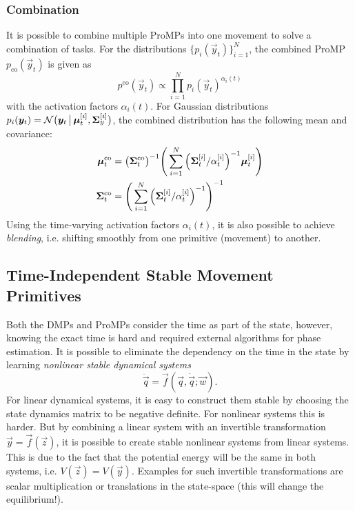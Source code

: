 			\subsubsection{Combination}
				It is possible to combine multiple ProMPs into one movement to solve a combination of tasks. For the distributions \( \{ p_i(\vec{y}_t) \}_{i = 1}^{N} \), the combined ProMP \( p_\mathrm{co}(\vec{y}_t) \) is given as
				\begin{equation*}
					p^\mathrm{co}(\vec{y}_t) \propto \prod_{i = 1}^{N} p_i(\vec{y}_t)^{\alpha_i(t)}
				\end{equation*}
				with the activation factors \( \alpha_i(t) \). For Gaussian distributions \( p_i(\bm{y}_t) = \mathcal{N}\big( \bm{y}_t \,\big\vert\, \bm{\mu}_t^{[i]}, \bm{\Sigma}_y^{[i]} \big) \), the combined distribution has the following mean and covariance:
				\begin{align*}
					\bm{\mu}_t^\mathrm{co} &= \big( \bm{\Sigma}_t^\mathrm{co} \big)^{-1} \Bigg( \sum_{i = 1}^{N} \Big( \bm{\Sigma}_t^{[i]} / \alpha_t^{[i]} \Big)^{-1} \bm{\mu}_t^{[i]} \Bigg) \\
					\bm{\Sigma}_t^\mathrm{co} &= \Bigg( \sum_{i = 1}^{N} \Big( \bm{\Sigma}_t^{[i]} / \alpha_t^{[i]} \Big)^{-1} \Bigg)^{-1}
				\end{align*}
				Using the time-varying activation factors \( \alpha_i(t) \), it is also possible to achieve \emph{blending}, i.e. shifting smoothly from one primitive (movement) to another.

		\subsection{Time-Independent Stable Movement Primitives}
			Both the DMPs and ProMPs consider the time as part of the state, however, knowing the exact time is hard and required external algorithms for phase estimation. It is possible to eliminate the dependency on the time in the state by learning \emph{nonlinear stable dynamical systems}
			\begin{equation*}
				\ddot{\vec{q}} = \vec{f}(\vec{q}, \dot{\vec{q}}; \vec{w}).
			\end{equation*}
			For linear dynamical systems, it is easy to construct them stable by choosing the state dynamics matrix to be negative definite. For nonlinear systems this is harder. But by combining a linear system with an invertible transformation \( \vec{y} = \vec{f}(\vec{z}) \), it is possible to create stable nonlinear systems from linear systems. This is due to the fact that the potential energy will be the same in both systems, i.e. \( V(\vec{z}) = V(\vec{y}) \). Examples for such invertible transformations are scalar multiplication or translations in the state-space (this will change the equilibrium!).

